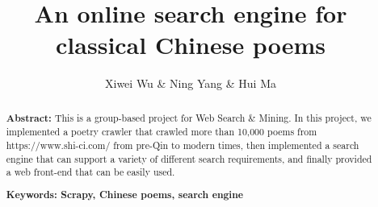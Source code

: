 \documentclass{scrartcl}
\begin{document}
\title{An online search engine for classical Chinese poems}
\author{Xiwei Wu \& Ning Yang \& Hui Ma}

\date{}
\maketitle

\begin{abstract}
  \textbf{Abstract:} This is a group-based project for Web Search \& Mining. In this project, we implemented a poetry crawler that crawled more than 10,000 poems from https://www.shi-ci.com/ from pre-Qin to modern times, then implemented a search engine that can support a variety of different search requirements, and finally provided a web front-end that can be easily used. 

\textbf{Keywords: Scrapy, Chinese poems, search engine}
\end{abstract}







\end{document}
